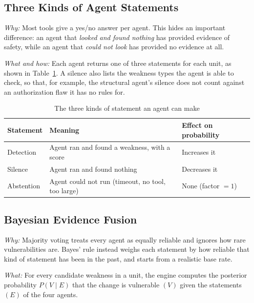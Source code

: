 \documentclass[conference]{IEEEtran}
\begin{document}
\subsection{Three Kinds of Agent Statements}
\label{subsec:evidence}

\textit{Why:} Most tools give a yes/no answer per agent. This hides an
important difference: an agent that \emph{looked and found nothing} has
provided evidence of safety, while an agent that \emph{could not look} has
provided no evidence at all.

\textit{What and how:} Each agent returns one of three statements for each
unit, as shown in Table~\ref{tab:evidence}. A silence also lists the
weakness types the agent is able to check, so that, for example, the
structural agent's silence does not count against an authorization flaw
it has no rules for.

\begin{table}[t]
\centering
\caption{The three kinds of statement an agent can make}
\label{tab:evidence}
\small
\setlength{\tabcolsep}{3pt}
\begin{tabular}{p{1.55cm}p{3.35cm}p{2.5cm}}
\toprule
Statement & Meaning & Effect on probability \\
\midrule
Detection  & Agent ran and found a weakness, with a score & Increases it \\
Silence    & Agent ran and found nothing  & Decreases it \\
Abstention & Agent could not run (timeout, no tool, too large) & None (factor $=1$) \\
\bottomrule
\end{tabular}
\end{table}

\subsection{Bayesian Evidence Fusion}
\label{subsec:fusion}

\textit{Why:} Majority voting treats every agent as equally reliable and
ignores how rare vulnerabilities are. Bayes' rule instead weighs each
statement by how reliable that kind of statement has been in the past, and
starts from a realistic base rate.

\textit{What:} For every candidate weakness in a unit, the engine
computes the posterior probability $P(V \mid E)$ that the change is
vulnerable $(V)$ given the statements $(E)$ of the four agents.
\end{document}
